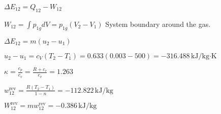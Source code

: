 \( \Delta E_{12} = Q_{12} - W_{12} \)  

\( W_{12} = \int p_{1g} dV = p_{1g} (V_2 - V_1) \)  
System boundary around the gas.  

\( \Delta E_{12} = m (u_2 - u_1) \)  

\( u_2 - u_1 = c_V (T_2 - T_1) = 0.633 (0.003 - 500) = -316.488 \, \text{kJ/kg·K} \)  

\( \kappa = \frac{c_p}{c_v} = \frac{R + c_v}{c_v} = 1.263 \)  

\( w_{12}^{\text{rev}} = \frac{R (T_2 - T_1)}{1 - n} = -112.822 \, \text{kJ/kg} \)  

\( W_{12}^{\text{rev}} = m w_{12}^{\text{rev}} = -0.386 \, \text{kJ/kg} \)
